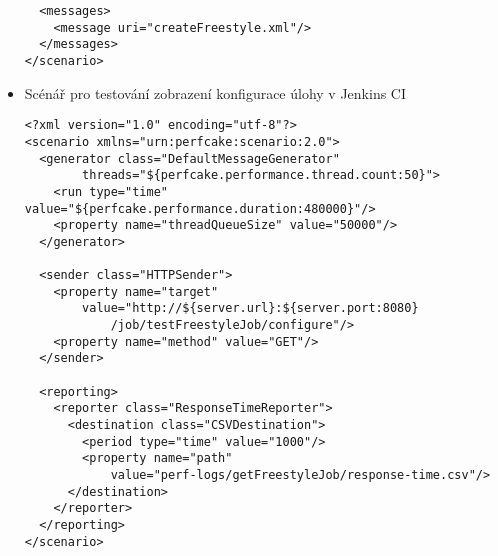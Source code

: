 \begin{itemize}
\begin{verbatim}
  <messages>
    <message uri="createFreestyle.xml"/>
  </messages>
</scenario>
\end{verbatim}

        \item Scénář pro testování zobrazení konfigurace úlohy v Jenkins CI
\begin{verbatim}
<?xml version="1.0" encoding="utf-8"?>
<scenario xmlns="urn:perfcake:scenario:2.0">
  <generator class="DefaultMessageGenerator" 
        threads="${perfcake.performance.thread.count:50}">
    <run type="time" value="${perfcake.performance.duration:480000}"/>
    <property name="threadQueueSize" value="50000"/>
  </generator>
  
  <sender class="HTTPSender">
    <property name="target" 
        value="http://${server.url}:${server.port:8080}
            /job/testFreestyleJob/configure"/>
    <property name="method" value="GET"/>                                                                                               
  </sender>
  
  <reporting>
    <reporter class="ResponseTimeReporter">
      <destination class="CSVDestination">
        <period type="time" value="1000"/>
        <property name="path" 
            value="perf-logs/getFreestyleJob/response-time.csv"/>
      </destination>
    </reporter>
  </reporting>
</scenario>

\end{verbatim}
    \end{itemize}




